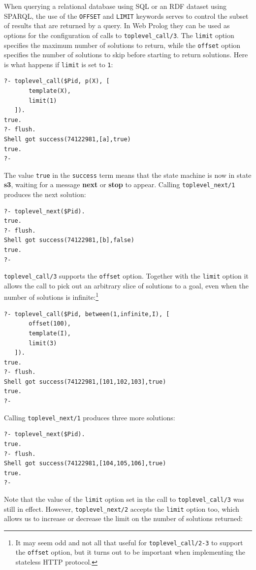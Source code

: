 When querying a relational database using SQL or an RDF dataset using SPARQL, the use of the \texttt{OFFSET} and \texttt{LIMIT} keywords serves to control the subset of results that are returned by a query. In Web Prolog they can be used as options for the configuration of calls to \texttt{toplevel\_call/3}. The \texttt{limit} option specifies the maximum number of solutions to return, while the \texttt{offset} option specifies the number of solutions to skip before starting to return solutions. Here is what happens if \texttt{limit} is set to \texttt{1}:

\begin{verbatim}
?- toplevel_call($Pid, p(X), [
       template(X),
       limit(1)
   ]).
true.
?- flush.
Shell got success(74122981,[a],true)
true.
?-
\end{verbatim}

\noindent The value \texttt{true} in the \texttt{success} term means that the state machine is now in state \textbf{s3}, waiting for a message \textbf{next} or \textbf{stop} to appear. Calling \texttt{toplevel\_next/1} produces the next solution:

\begin{verbatim}
?- toplevel_next($Pid).
true.
?- flush.
Shell got success(74122981,[b],false)
true.
?-
\end{verbatim}

\noindent \texttt{toplevel\_call/3} supports the \texttt{offset} option. Together with the \texttt{limit} option it allows the call to pick out an arbitrary slice of solutions to a goal, even when the number of solutions is infinite:\footnote{It may seem odd and not all that useful for \texttt{toplevel\_call/2-3} to support the \texttt{offset} option, but it turns out to be important when implementing the stateless HTTP protocol.} 

\begin{verbatim}
?- toplevel_call($Pid, between(1,infinite,I), [
       offset(100),
       template(I),
       limit(3)
   ]).
true.
?- flush.
Shell got success(74122981,[101,102,103],true)
true.
?-
\end{verbatim}

\noindent Calling \texttt{toplevel\_next/1} produces three more solutions:

\begin{verbatim}
?- toplevel_next($Pid).
true.
?- flush.
Shell got success(74122981,[104,105,106],true)
true.
?-
\end{verbatim}

\noindent Note that the value of the \texttt{limit} option set in the call to \texttt{toplevel\_call/3} was still in effect. However, \texttt{toplevel\_next/2} accepts the \texttt{limit} option too, which allows us to increase or decrease the limit on the number of solutions returned:

